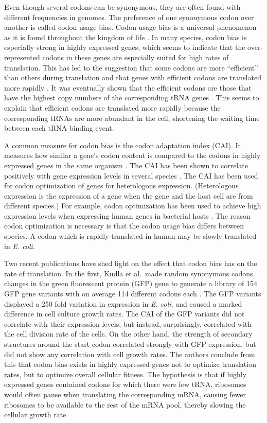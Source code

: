 Even though several codons can be synonymous, they are often found with
different frequencies in genomes. The preference of one synonymous codon over
another is called codon usage bias. Codon usage bias is a universal phenomenon
as it is found throughout the kingdom of life \cite{sharp_codon_1988}. In many
species, codon bias is especially strong in highly expressed genes, which seems
to indicate that the over-represented codons in these genes are especially
suited for high rates of translation.  This has led to the suggestion that some
codons are more ``efficient'' than others during translation and that genes
with efficient codons are translated more rapidly \cite{moriyama_gene_1998}. It
was eventually shown that the efficient codons are those that have the highest
copy numbers of the corresponding tRNA genes \cite{reis_solving_2004,
elf_selective_2003}. This seems to explain that efficient codons are translated
more rapidly because the corresponding tRNAs are more abundant in the cell,
shortening the waiting time between each tRNA binding event.

A common measure for codon bias is the codon adaptation index (CAI). It
measures how similar a gene's codon content is compared to the codons in highly
expressed genes in the same organism \cite{sharp_codon_1987}. The CAI has been
shown to correlate positively with gene expression levels in several species
\cite{duret_expression_1999, jansen_revisiting_2003}. The CAI has been used for
codon optimization of genes for heterologous expression. (Heterologous
expression is the expression of a gene when the gene and the host cell are from
different species.) For example, codon optimization has been used to
achieve high expression levels when expressing human genes in bacterial hosts
\cite{gustafsson_codon_2004}. The reason codon optimization is necessary is
that the codon usage bias differs between species. A codon which is rapidly
translated in human may be slowly translated in \textit{E. coli}.

Two recent publications have shed light on the effect that codon bias has on
the rate of translation. In the first, Kudla et al.\ made random synonymous
codons changes in the green fluorescent protein (GFP) gene to generate a
library of 154 GFP gene variants with on average 114 different codons each
\cite{kudla_coding-sequence_2009}. The GFP variants displayed a 250 fold
variation in expression in \textit{E. coli}, and caused a marked difference in
cell culture growth rates. The CAI of the GFP variants did not correlate with
their expression levels, but instead, surprisingly, correlated with the cell
division rate of the cells. On the other hand, the strength of secondary
structures around the start codon correlated strongly with GFP expression, but
did not show any correlation with cell growth rates. The authors conclude from
this that codon bias exists in highly expressed genes not to optimize
translation rates, but to optimize overall cellular fitness. The hypothesis is
that if highly expressed genes contained codons for which there were few tRNA,
ribosomes would often pause when translating the corresponding mRNA, causing
fewer ribosomes to be available to the rest of the mRNA pool, thereby slowing
the cellular growth rate \cite{kudla_coding-sequence_2009}

